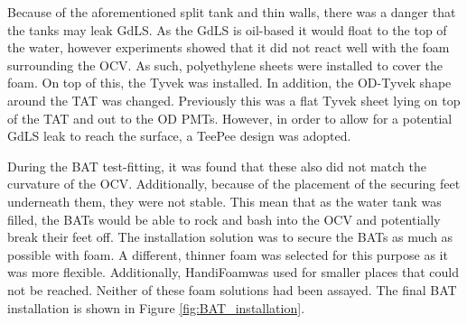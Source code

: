 \par
Because of the aforementioned split tank and thin walls, there was a danger that the tanks may leak GdLS.
As the GdLS is oil-based it would float to the top of the water, however experiments showed that it did not react well with the foam surrounding the OCV.
As such, polyethylene sheets were installed to cover the foam. 
On top of this, the Tyvek was installed.
In addition, the OD-Tyvek shape around the TAT was changed.
Previously this was a flat Tyvek sheet lying on top of the TAT and out to the OD PMTs.
However, in order to allow for a potential GdLS leak to reach the surface, a TeePee design was adopted.


\par
During the BAT test-fitting, it was found that these also did not match the curvature of the OCV.
Additionally, because of the placement of the securing feet underneath them, they were not stable.
This mean that as the water tank was filled, the BATs would be able to rock and bash into the OCV and potentially break their feet off.
The installation solution was to secure the BATs as much as possible with foam.
A different, thinner foam was selected for this purpose as it was more flexible.
Additionally, HandiFoam\textregistered was used for smaller places that could not be reached.
Neither of these foam solutions had been assayed.
The final BAT installation is shown in Figure \ref{fig:BAT_installation}.

